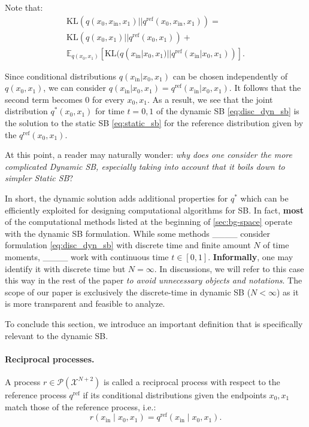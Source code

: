 Note that:
\begin{eqnarray}
    \label{eq:disc_disintegration}
    \text{KL}(q(x_0, x_{\text{in}}, x_1)|| q^{\text{ref}}(x_0, x_{\text{in}}, x_1)) = 
    \nonumber
    \\
    \text{KL}(q(x_0, x_1)||q^{\text{ref}}(x_0, x_1)) + 
    \nonumber
    \\ \mathbb{E}_{q(x_0,x_1)} \left[\text{KL}(q(x_{\text{in}}|x_0, x_1)||q^{\text{ref}}(x_{\text{in}}|x_0, x_1)) \right]. 
    \label{kl-reciprocal-zero}
\end{eqnarray}

Since conditional distributions $q(x_{\text{in}}|x_0, x_1)$ can be chosen independently of $q(x_0, x_1)$, we can consider $q(x_{\text{in}}|x_0, x_1) = q^{\text{ref}}(x_{\text{in}}|x_0, x_1)$. It follows that the second term becomes $0$ for every $x_0,x_1$. As a result, we see that the joint distribution $q^{*}(x_0,x_1)$ for time $t=0,1$ of the dynamic SB \eqref{eq:disc_dyn_sb} is the solution to the static SB \eqref{eq:static_sb} for the reference distribution given by the $q^{\text{ref}}(x_0,x_1)$.

At this point, a reader may naturally wonder: \textit{why does one consider the more complicated Dynamic SB, especially taking into account that it boils down to simpler Static SB}?

In short, the dynamic solution adds additional properties for $q^{*}$ which can be efficiently exploited for designing computational algorithms for SB. In fact, \textbf{most} of the computational methods listed at the beginning of \wasyparagraph\ref{sec:bg-space} operate with the dynamic SB formulation. While some methods ____ consider formulation \eqref{eq:disc_dyn_sb} with discrete time and finite amount $N$ of time moments, ____ work with continuous time $t\in [0,1]$. \textbf{Informally}, one may identify it with discrete time but $N=\infty$. In discussions, we will refer to this case this way in the rest of the paper \textit{to avoid unnecessary objects and notations}. The scope of our paper is exclusively the discrete-time in dynamic SB ($N<\infty$) as it is more transparent and feasible to analyze.

To conclude this section, we introduce an important definition that is specifically relevant to the dynamic SB.

\paragraph{Reciprocal processes.} A process $r \in \mathcal{P}(\mathcal{X}^{N+2})$ is called a reciprocal process with respect to the reference process $q^{\text{ref}}$ if its conditional distributions given the endpoints $x_0, x_1$ match those of the reference process, i.e.:
\begin{equation*}
    r(x_{\text{in}} \mid x_0, x_1) = q^{\text{ref}}(x_{\text{in}} \mid x_0, x_1).
\end{equation*}
    
